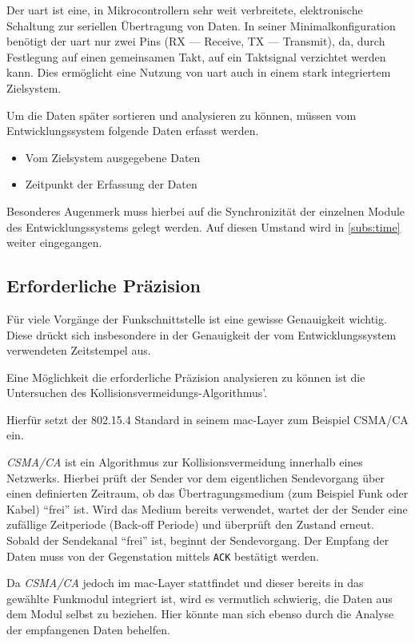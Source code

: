 \begin{definition}[UART]
Der \gls{uart} ist eine, in Mikrocontrollern sehr weit verbreitete,
elektronische Schaltung zur seriellen Übertragung von Daten. In
seiner Minimalkonfiguration benötigt der \gls{uart} nur zwei Pins (RX ---
Receive, TX --- Transmit), da, durch Festlegung auf einen gemeinsamen Takt, auf
ein Taktsignal verzichtet werden kann. Dies ermöglicht eine Nutzung von
\gls{uart} auch in einem stark integriertem Zielsystem.
\end{definition}

\begin{minipage}[c]{\textwidth}
Um die Daten später sortieren und analysieren zu können, müssen vom
Entwicklungssystem folgende Daten erfasst werden.
\begin{itemize}
  \item Vom Zielsystem ausgegebene Daten
  \item Zeitpunkt der Erfassung der Daten
\end{itemize}
\end{minipage}

Besonderes Augenmerk muss hierbei auf die Synchronizität der einzelnen Module
des Entwicklungssystems gelegt werden. Auf diesen Umstand wird in
\autoref{subs:time} weiter eingegangen. 

\subsection{Erforderliche Präzision}
Für viele Vorgänge der Funkschnittstelle ist eine gewisse Genauigkeit wichtig.
Diese drückt sich insbesondere in der Genauigkeit der vom Entwicklungssystem
verwendeten Zeitstempel aus.

Eine Möglichkeit die erforderliche Präzision analysieren zu können ist die
Untersuchen des Kollisionsvermeidungs-Algorithmus'.

Hierfür setzt der 802.15.4 Standard in seinem \gls{mac}-Layer zum Beispiel
CSMA/CA ein\cite{IEEE01}.
\begin{definition}[CSMA/CA]
\emph{CSMA/CA} ist ein Algorithmus zur Kollisionsvermeidung innerhalb eines
Netzwerks. Hierbei prüft der Sender vor dem eigentlichen Sendevorgang über
einen definierten Zeitraum, ob das Übertragungsmedium (zum Beispiel Funk oder
Kabel) "`frei"' ist. Wird das Medium bereits verwendet, wartet der der Sender
eine zufällige Zeitperiode (Back-off Periode) und überprüft den Zustand erneut.
Sobald der Sendekanal "`frei"' ist, beginnt der Sendevorgang. Der Empfang der Daten muss
von der Gegenstation mittels \texttt{ACK} bestätigt werden.
\end{definition}
Da \emph{CSMA/CA} jedoch im \gls{mac}-Layer stattfindet und dieser bereits
in das gewählte Funkmodul integriert ist, wird es vermutlich schwierig,
die Daten aus dem Modul selbst zu beziehen. Hier könnte man sich ebenso durch
die Analyse der empfangenen Daten behelfen.

